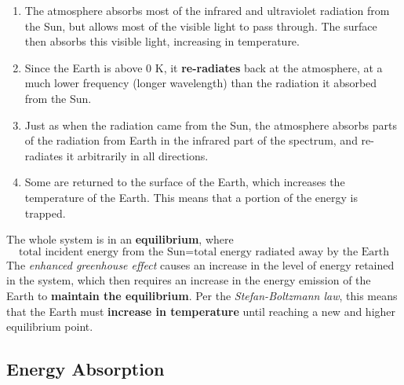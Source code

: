 \documentclass[a4paper,12pt]{article}
\begin{document}
\begin{enumerate}
  \item The atmosphere absorbs most of the infrared and ultraviolet radiation from the Sun, but allows most of the visible light to pass through. The surface then absorbs this visible light, increasing in temperature.
  \item Since the Earth is above 0 K, it \textbf{re-radiates} back at the atmosphere, at a much lower frequency (longer wavelength) than the radiation it absorbed from the Sun.
  \item Just as when the radiation came from the Sun, the atmosphere absorbs parts of the radiation from Earth in the infrared part of the spectrum, and re-radiates it arbitrarily in all directions.
  \item Some are returned to the surface of the Earth, which increases the temperature of the Earth. This means that a portion of the energy is trapped.
\end{enumerate}

The whole system is in an \textbf{equilibrium}, where
$$\text{total incident energy from the Sun} = \text{total energy radiated away by the Earth}$$
The \textit{enhanced greenhouse effect} causes an increase in the level of energy retained in the system, which then requires an increase in the energy emission of the Earth to \textbf{maintain the equilibrium}. Per the \textit{Stefan-Boltzmann law}, this means that the Earth must \textbf{increase in temperature} until reaching a new and higher equilibrium point.

\subsection{Energy Absorption}
\end{document}
